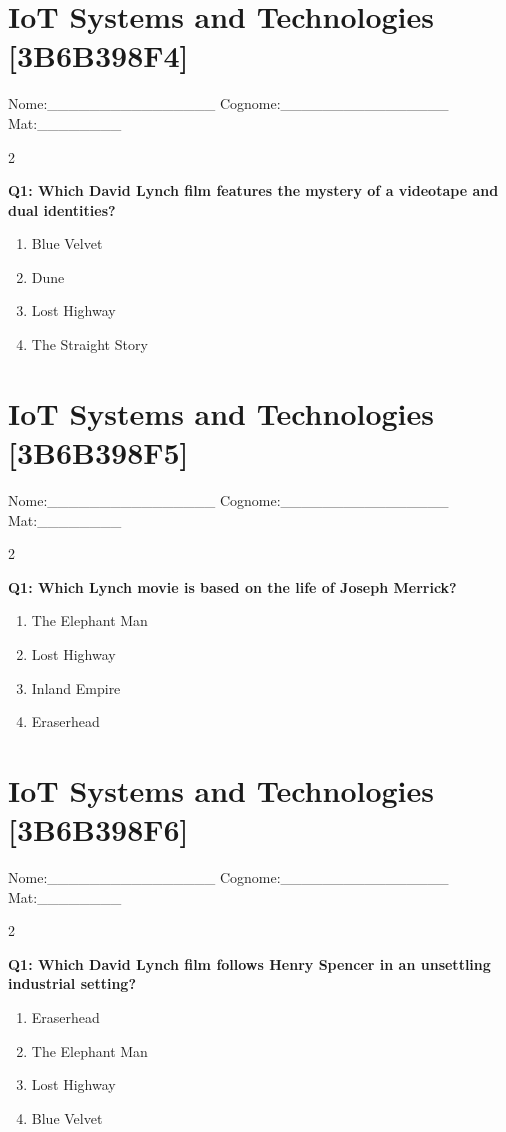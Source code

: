 \documentclass[10pt]{article}
\begin{document}
\newpage

\section*{IoT Systems and Technologies \footnotesize [3B6B398F4]}
{\footnotesize Nome:\_\_\_\_\_\_\_\_\_\_\_\_\_\_\_\_ Cognome:\_\_\_\_\_\_\_\_\_\_\_\_\_\_\_\_ Mat:\_\_\_\_\_\_\_\_}
\begin{multicols}{2}

\textbf{Q1: Which David Lynch film features the mystery of a videotape and dual identities?}

\begin{enumerate}[label=\arabic*.]
\item Blue Velvet
\item Dune
\item Lost Highway
\item The Straight Story
\end{enumerate}
\end{multicols}

\newpage

\section*{IoT Systems and Technologies \footnotesize [3B6B398F5]}
{\footnotesize Nome:\_\_\_\_\_\_\_\_\_\_\_\_\_\_\_\_ Cognome:\_\_\_\_\_\_\_\_\_\_\_\_\_\_\_\_ Mat:\_\_\_\_\_\_\_\_}
\begin{multicols}{2}

\textbf{Q1: Which Lynch movie is based on the life of Joseph Merrick?}

\begin{enumerate}[label=\arabic*.]
\item The Elephant Man
\item Lost Highway
\item Inland Empire
\item Eraserhead
\end{enumerate}
\end{multicols}

\newpage

\section*{IoT Systems and Technologies \footnotesize [3B6B398F6]}
{\footnotesize Nome:\_\_\_\_\_\_\_\_\_\_\_\_\_\_\_\_ Cognome:\_\_\_\_\_\_\_\_\_\_\_\_\_\_\_\_ Mat:\_\_\_\_\_\_\_\_}
\begin{multicols}{2}

\textbf{Q1: Which David Lynch film follows Henry Spencer in an unsettling industrial setting?}

\begin{enumerate}[label=\arabic*.]
\item Eraserhead
\item The Elephant Man
\item Lost Highway
\item Blue Velvet
\end{enumerate}
\end{multicols}
\end{document}
